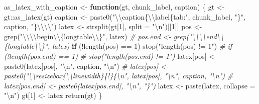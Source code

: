 \documentclass[
]{article}
\newenvironment{Shaded}{\begin{snugshade}}{\end{snugshade}}
\newcommand{\AttributeTok}[1]{\textcolor[rgb]{0.77,0.63,0.00}{#1}}
\newcommand{\CommentTok}[1]{\textcolor[rgb]{0.56,0.35,0.01}{\textit{#1}}}
\newcommand{\ControlFlowTok}[1]{\textcolor[rgb]{0.13,0.29,0.53}{\textbf{#1}}}
\newcommand{\DecValTok}[1]{\textcolor[rgb]{0.00,0.00,0.81}{#1}}
\newcommand{\FunctionTok}[1]{\textcolor[rgb]{0.00,0.00,0.00}{#1}}
\newcommand{\NormalTok}[1]{#1}
\newcommand{\OtherTok}[1]{\textcolor[rgb]{0.56,0.35,0.01}{#1}}
\newcommand{\SpecialCharTok}[1]{\textcolor[rgb]{0.00,0.00,0.00}{#1}}
\newcommand{\StringTok}[1]{\textcolor[rgb]{0.31,0.60,0.02}{#1}}
\begin{document}
\begin{Shaded}
\begin{Highlighting}[]
\NormalTok{as\_latex\_with\_caption }\OtherTok{\textless{}{-}} \ControlFlowTok{function}\NormalTok{(gt, chunk\_label, caption) \{}
\NormalTok{  gt }\OtherTok{\textless{}{-}}\NormalTok{ gt}\SpecialCharTok{::}\FunctionTok{as\_latex}\NormalTok{(gt)}
\NormalTok{  caption }\OtherTok{\textless{}{-}} \FunctionTok{paste0}\NormalTok{(}\StringTok{"}\SpecialCharTok{\textbackslash{}\textbackslash{}}\StringTok{caption\{}\SpecialCharTok{\textbackslash{}\textbackslash{}}\StringTok{label\{tab:"}\NormalTok{, chunk\_label, }\StringTok{"\}"}\NormalTok{, caption, }\StringTok{"\}}\SpecialCharTok{\textbackslash{}\textbackslash{}\textbackslash{}\textbackslash{}}\StringTok{"}\NormalTok{)}
\NormalTok{  latex }\OtherTok{\textless{}{-}} \FunctionTok{strsplit}\NormalTok{(gt[}\DecValTok{1}\NormalTok{], }\AttributeTok{split =} \StringTok{"}\SpecialCharTok{\textbackslash{}n}\StringTok{"}\NormalTok{)[[}\DecValTok{1}\NormalTok{]]}
\NormalTok{  pos }\OtherTok{\textless{}{-}} \FunctionTok{grep}\NormalTok{(}\StringTok{"}\SpecialCharTok{\textbackslash{}\textbackslash{}\textbackslash{}\textbackslash{}}\StringTok{begin}\SpecialCharTok{\textbackslash{}\textbackslash{}}\StringTok{\{longtable}\SpecialCharTok{\textbackslash{}\textbackslash{}}\StringTok{\}"}\NormalTok{, latex)}
  \CommentTok{\# pos.end \textless{}{-} grep("\textbackslash{}\textbackslash{}\textbackslash{}\textbackslash{}end\textbackslash{}\textbackslash{}\{longtable\textbackslash{}\textbackslash{}\}", latex)}
  \ControlFlowTok{if}\NormalTok{ (}\SpecialCharTok{!}\FunctionTok{length}\NormalTok{(pos) }\SpecialCharTok{==} \DecValTok{1}\NormalTok{)}
    \FunctionTok{stop}\NormalTok{(}\StringTok{"length(pos) != 1"}\NormalTok{)}
  \CommentTok{\# if (!length(pos.end) == 1)}
    \CommentTok{\# stop("length(pos.end) != 1")}
\NormalTok{  latex[pos] }\OtherTok{\textless{}{-}} \FunctionTok{paste0}\NormalTok{(latex[pos], }\StringTok{"}\SpecialCharTok{\textbackslash{}n}\StringTok{"}\NormalTok{, caption, }\StringTok{"}\SpecialCharTok{\textbackslash{}n}\StringTok{"}\NormalTok{)}
  \CommentTok{\# latex[pos] \textless{}{-} paste0("\textbackslash{}\textbackslash{}resizebox\{\textbackslash{}\textbackslash{}linewidth\}\{!\}\{\textbackslash{}n", latex[pos], "\textbackslash{}n", caption, "\textbackslash{}n")}
  \CommentTok{\# latex[pos.end] \textless{}{-} paste0(latex[pos.end], "\textbackslash{}n", "\}")}
\NormalTok{  latex }\OtherTok{\textless{}{-}} \FunctionTok{paste}\NormalTok{(latex, }\AttributeTok{collapse =} \StringTok{"}\SpecialCharTok{\textbackslash{}n}\StringTok{"}\NormalTok{)}
\NormalTok{  gt[}\DecValTok{1}\NormalTok{] }\OtherTok{\textless{}{-}}\NormalTok{ latex}
  \FunctionTok{return}\NormalTok{(gt)}
\NormalTok{\}}


\end{Highlighting}
\end{Shaded}
\end{document}
